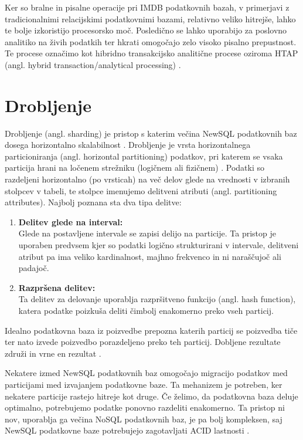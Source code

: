 \documentclass[a4paper, 12pt]{book}
\begin{document}
Ker so bralne in pisalne operacije pri IMDB podatkovnih bazah, v primerjavi z tradicionalnimi relacijskimi podatkovnimi bazami, relativno veliko hitrejše, lahko te bolje izkoristijo procesorsko moč. Posledično se lahko uporabijo za poslovno analitiko na živih podatkih ter hkrati omogočajo zelo visoko pisalno prepustnost. Te procese označimo kot hibridno transakcijsko analitične procese oziroma HTAP (angl. hybrid transaction/analytical processing) \cite{NewSqlInMemoryAnalytics}.


\section{Drobljenje}
Drobljenje (angl. sharding) je pristop s katerim večina NewSQL podatkovnih baz dosega horizontalno skalabilnost \cite{Pavlo2016Sep}. Drobljenje je vrsta horizontalnega particioniranja (angl. horizontal partitioning) podatkov, pri katerem se vsaka particija hrani na ločenem strežniku (logičnem ali fizičnem) \cite{WikiSharding}. Podatki so razdeljeni horizontalno (po vrsticah) na več delov glede na vrednosti v izbranih stolpcev v tabeli, te stolpce imenujemo delitveni atributi (angl. partitioning attributes). Najbolj poznana sta dva tipa delitve:

\begin{enumerate}
    \item \textbf{Delitev glede na interval:}\\Glede na postavljene intervale se zapisi delijo na particije. Ta pristop je uporaben predvsem kjer so podatki logično strukturirani v intervale, delitveni atribut pa ima veliko kardinalnost, majhno frekvenco in ni naraščujoč ali padajoč.
    \item \textbf{Razpršena delitev:}\\Ta delitev za delovanje uporablja razpršitveno funkcijo (angl. hash function), katera podatke poizkuša deliti čimbolj enakomerno preko vseh particij.
\end{enumerate}

Idealno podatkovna baza iz poizvedbe prepozna katerih particij se poizvedba tiče ter nato izvede poizvedbo porazdeljeno preko teh particij. Dobljene rezultate združi in vrne en rezultat \cite{Pavlo2016Sep}.

Nekatere izmed NewSQL podatkovnih baz omogočajo migracijo podatkov med particijami med izvajanjem podatkovne baze. Ta mehanizem je potreben, ker nekatere particije rastejo hitreje kot druge. Če želimo, da podatkovna baza deluje optimalno, potrebujemo podatke ponovno razdeliti enakomerno. Ta pristop ni nov, uporablja ga večina NoSQL podatkovnih baz, je pa bolj kompleksen, saj NewSQL podatkovne baze 
potrebujejo zagotavljati ACID lastnosti \cite{Pavlo2016Sep}.
\end{document}
